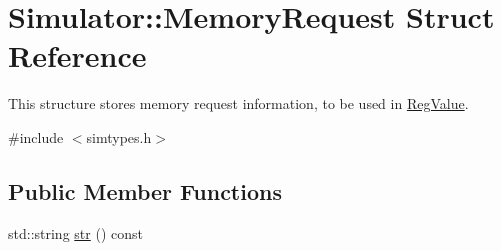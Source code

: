 \hypertarget{struct_simulator_1_1_memory_request}{\section{Simulator\+:\+:Memory\+Request Struct Reference}
\label{struct_simulator_1_1_memory_request}
}


This structure stores memory request information, to be used in \hyperlink{struct_simulator_1_1_reg_value}{Reg\+Value}.  




{\ttfamily \#include $<$simtypes.\+h$>$}

\subsection*{Public Member Functions}
\begin{DoxyCompactItemize}
\item 
std\+::string \hyperlink{struct_simulator_1_1_memory_request_a3453eb77386d52fdec6b5a0727e1ca76}{str} () const 
\end{DoxyCompactItemize}
